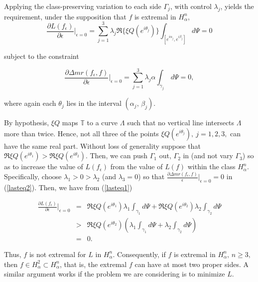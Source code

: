 \documentclass[final]{siamltex}
\newcommand{\T}{\mathbb{T}}
\newcommand{\eps}{\epsilon}
\newcommand{\del}{\partial}
\begin{document}
Applying the class-preserving variation to each side $\Gamma_j$,  with control $\lambda_j$, yields the requirement, under the supposition that $f$ is extremal in $H^n_{\alpha}$,
\begin{equation}\label{lasteq1}
\frac{\del L(f_{\eps})}{\del \eps} \big \vert_{\eps = 0} = \sum^3_{j=1} \lambda_j \Re \{\xi Q(e^{i\theta_j})\}\int_{\left[  e^{i\alpha_j}, e^{i\beta_j} \right ]}d\Psi = 0
\end{equation}

\noindent subject to the constraint 

\begin{equation}\label{lasteq2}
\frac{\partial \Delta mr(f_{\eps},f)}{\partial\eps} \big \vert_{\eps = 0} =
\sum_{j=1}^3 \lambda_j \alpha \int_{\gamma_j} \,d\Psi  = 0,
\end{equation}

\noindent where again each $\theta_j$ lies in the interval  $\left( \alpha_j, \, \beta_j \right)$.  


By hypothesis, $\xi Q$ maps $\T$ to a curve $\Lambda$ such that no vertical line intersects $\Lambda$ more than twice. Hence, 
not all three of the points $\xi Q(e^{i\theta_j}),\ j=1,2,3,$ can
have the same real part.  Without loss 
of generality suppose that $\Re \xi Q(e^{i\theta_1}) > \Re \xi Q(e^{i\theta_2})$.  
Then, we can push $\Gamma_1$ out, $\Gamma_2$ in (and not vary
$\Gamma_3$) so as to increase the value of $L(f_{\eps})$ from the value of $L(f)$
within the class $H_{\alpha}^n$.  Specifically, choose $\lambda_1 > 0 > \lambda_2$
(and $\lambda_3 = 0$) so that $\frac{\partial \Delta mr(f_{\eps},f)}{\eps} \vert_{\eps = 0}
= 0$ in (\ref{lasteq2}).  Then, we have from (\ref{lasteq1})

\begin{eqnarray}\label{lasteq3}
\frac{\partial L(f_{\eps})}{\partial \eps} \big \vert_{\eps = 0} &=& \Re \xi Q(e^{i\theta_1}) {\lambda_1}
\int_{\gamma_1} d\Psi + \Re \xi Q(e^{i\theta_2}) {\lambda_2} \int_{\gamma_2} d\Psi
\\ \nonumber &>& \Re \xi Q(e^{i\theta_2}) \left({\lambda_1} \int_{\gamma_1} d\Psi +
{\lambda_2} \int_{\gamma_2} d\Psi \right) \\ \nonumber &=& 0 .\nonumber
\end{eqnarray}


Thus, $f$ is not extremal for $L$ in $H_{\alpha}^n$.  Consequently, if $f$ is
extremal in $H_{\alpha}^n,\, n\geq 3,$ then $f\in H_{\alpha}^2 \subset H_{\alpha}^n$,
that is,  the extremal $f$ can have at most two proper sides.  A similar argument works if the problem we are considering is to minimize $L$. 
\end{document}
